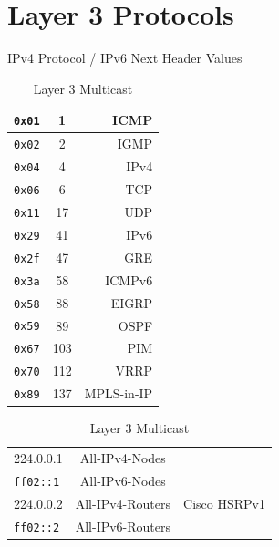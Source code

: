 \documentclass[12pt]{article}
\begin{document}
\section{Layer 3 Protocols \label{sec:L3}}
	\begin{table}[H]
	\begin{minipage}{.35\linewidth}
	\centering
	\caption{IPv4 Protocol / IPv6 Next Header Values \label{tab:L3 PROTOCOL}}
	\begin{tabular}{| c | c | r|}\hline
	\texttt{0x01}	& 1			& ICMP\\\hline
	\texttt{0x02}	& 2			& IGMP\\\hline
	\texttt{0x04}	& 4			& IPv4\\\hline
	\texttt{0x06}	& 6			& TCP\\\hline
	\texttt{0x11}	& 17			& UDP\\\hline
	\texttt{0x29}	& 41			& IPv6\\\hline
	\texttt{0x2f}		& 47			& GRE\\\hline
	\texttt{0x3a}	& 58			& ICMPv6\\\hline
	\texttt{0x58}	& 88			& EIGRP\\\hline
	\texttt{0x59}	& 89			& OSPF\\\hline
	\texttt{0x67}	& 103			& PIM\\\hline
	\texttt{0x70}	& 112			& VRRP\\\hline
	\texttt{0x89}	& 137			& MPLS-in-IP\\\hline
	\end{tabular}\end{minipage}%
	\begin{minipage}{.6\linewidth}
	\centering
	\caption{Layer 3 Multicast \label{tab:MULTICAST L3}}
	\begin{tabular}{| l | c | r|}\hline
	224.0.0.1		& All-IPv4-Nodes		&\\
	\texttt{ff02::1}	& All-IPv6-Nodes		&\\\hline
	224.0.0.2		& All-IPv4-Routers	& Cisco HSRPv1\\
	\texttt{ff02::2}	& All-IPv6-Routers	&\\\hline

\end{tabular}
\end{minipage}
\end{table}
\end{document}
